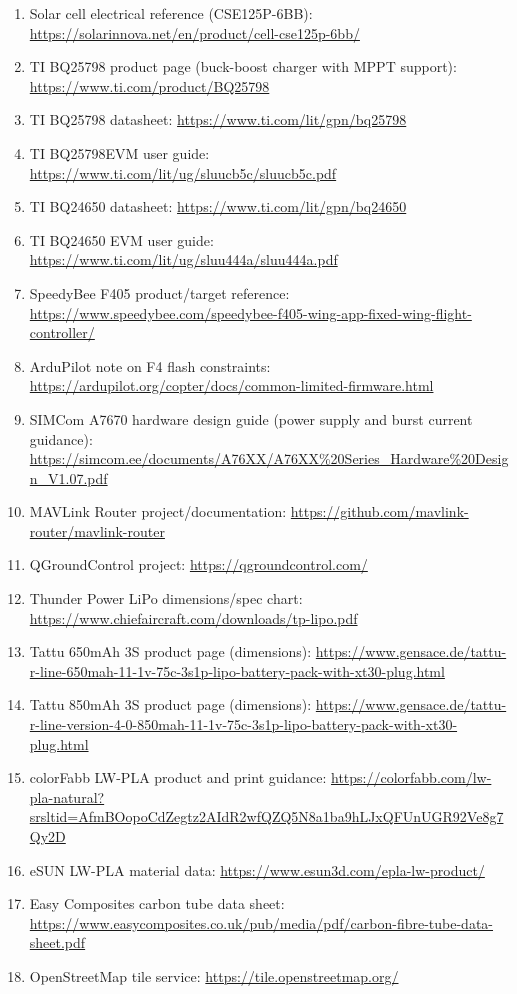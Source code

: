 \documentclass[11pt]{article}
\begin{document}
\begin{enumerate}
  \item Solar cell electrical reference (CSE125P-6BB): \url{https://solarinnova.net/en/product/cell-cse125p-6bb/}
  \item TI BQ25798 product page (buck-boost charger with MPPT support): \url{https://www.ti.com/product/BQ25798}
  \item TI BQ25798 datasheet: \url{https://www.ti.com/lit/gpn/bq25798}
  \item TI BQ25798EVM user guide: \url{https://www.ti.com/lit/ug/sluucb5c/sluucb5c.pdf}
  \item TI BQ24650 datasheet: \url{https://www.ti.com/lit/gpn/bq24650}
  \item TI BQ24650 EVM user guide: \url{https://www.ti.com/lit/ug/sluu444a/sluu444a.pdf}
  \item SpeedyBee F405 product/target reference: \url{https://www.speedybee.com/speedybee-f405-wing-app-fixed-wing-flight-controller/}
  \item ArduPilot note on F4 flash constraints: \url{https://ardupilot.org/copter/docs/common-limited-firmware.html}
  \item SIMCom A7670 hardware design guide (power supply and burst current guidance): \url{https://simcom.ee/documents/A76XX/A76XX%20Series_Hardware%20Design_V1.07.pdf}
  \item MAVLink Router project/documentation: \url{https://github.com/mavlink-router/mavlink-router}
  \item QGroundControl project: \url{https://qgroundcontrol.com/}
  \item Thunder Power LiPo dimensions/spec chart: \url{https://www.chiefaircraft.com/downloads/tp-lipo.pdf}
  \item Tattu 650mAh 3S product page (dimensions): \url{https://www.gensace.de/tattu-r-line-650mah-11-1v-75c-3s1p-lipo-battery-pack-with-xt30-plug.html}
  \item Tattu 850mAh 3S product page (dimensions): \url{https://www.gensace.de/tattu-r-line-version-4-0-850mah-11-1v-75c-3s1p-lipo-battery-pack-with-xt30-plug.html}
  \item colorFabb LW-PLA product and print guidance: \url{https://colorfabb.com/lw-pla-natural?srsltid=AfmBOopoCdZegtz2AIdR2wfQZQ5N8a1ba9hLJxQFUnUGR92Ve8g7Qy2D}
  \item eSUN LW-PLA material data: \url{https://www.esun3d.com/epla-lw-product/}
  \item Easy Composites carbon tube data sheet: \url{https://www.easycomposites.co.uk/pub/media/pdf/carbon-fibre-tube-data-sheet.pdf}
  \item OpenStreetMap tile service: \url{https://tile.openstreetmap.org/}
\end{enumerate}
\end{document}
